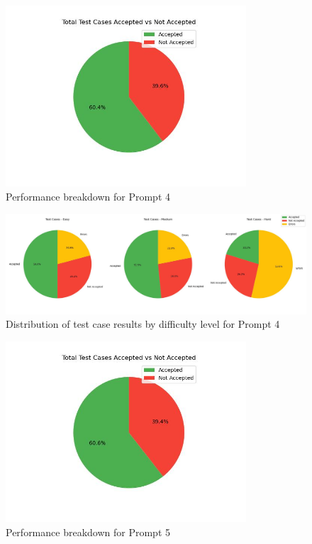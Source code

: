 \begin{figure}[H]
    \centering
    \includegraphics[width=0.8\textwidth]{figures/4/total_accepted_not.jpg}
    \caption{Performance breakdown for Prompt 4}
    \label{fig:prompt4_performance}
\end{figure}

\begin{figure}[H]
    \centering
    \includegraphics[width=1\textwidth]{figures/4/pie_difficulty.jpg}
    \caption{Distribution of test case results by difficulty level for Prompt 4}
    \label{fig:prompt4_difficulty}
\end{figure}

\begin{figure}[H]
    \centering
    \includegraphics[width=0.8\textwidth]{figures/5/total_accepted_not.jpg}
    \caption{Performance breakdown for Prompt 5}
    \label{fig:prompt5_performance}
\end{figure}

